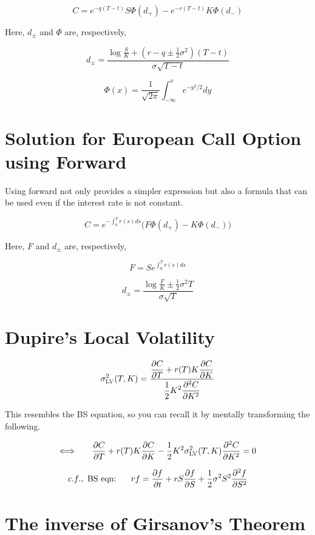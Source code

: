 \documentclass[uplatex]{jsarticle}
\begin{document}
\[
	C = e^{-q(T-t)} S \Phi(d_{+}) - e^{-r(T-t)} K \Phi(d_{-})
\]

Here, $d_{\pm}$ and $\Phi$ are, respectively,

\[
	d_{\pm} = \frac{ \displaystyle \log \frac{S}{K} + (r-q \pm \frac{1}{2} \sigma^{2} ) (T-t) }{ \sigma \sqrt{ T - t } }
\]

\[
	\Phi(x) = \frac{1}{ \sqrt{2 \pi} } \int^{x}_{- \infty} e^{-y^{2}/2} dy
\]


\section{Solution for European Call Option using Forward}

Using forward not only provides a simpler expression but also a formula that can be used even if the interest rate is not constant.

\[
	C = e^{-\int^{T}_{0} r(s) ds} \Big( F \Phi(d_{+}) - K \Phi(d_{-}) \Big)
\]

Here, $F$ and $d_{\pm}$ are, respectively,

\[
	F = S e^{\int^{T}_{0} r(s) ds }
\]

\[
	d_{\pm} = \frac{ \displaystyle \log \frac{F}{K} \pm \frac{1}{2} \sigma^{2} T }{ \sigma \sqrt{ T } }
\]

\section{Dupire's Local Volatility}

\[
	\sigma_{\rm LV}^{2}(T,K)
	=
	\frac{
		\displaystyle
		\frac{\partial C}{\partial T} + r(T) K \frac{\partial C}{\partial K}
	}{
		\displaystyle
		\frac{1}{2} K^{2}
		\frac{\partial^{2} C}{\partial K^{2}}
	}
\]

This resembles the BS equation, so you can recall it by mentally transforming the following.

\[
	\Longleftrightarrow
	\ \hspace{5mm}
	\frac{\partial C}{\partial T} + r(T) K \frac{\partial C}{\partial K}
	-
	\frac{1}{2} K^{2}
	\sigma_{\rm LV}^{2}(T,K)
	\frac{\partial^{2} C}{\partial K^{2}}
	=0
\]

\[
	c.f., \
	\text{BS eqn:}
	\ \hspace{5mm}
	rf
	=
	\frac{\partial f}{\partial t}
	+
	r S \frac{\partial f}{\partial S}
	+
	\frac{1}{2} \sigma^{2} S^{2}
	\frac{\partial^{2} f}{\partial S^{2}}
\]



\section{The inverse of Girsanov's Theorem}
\end{document}
